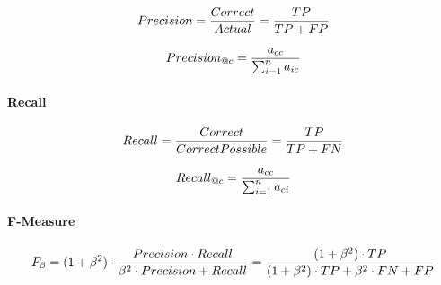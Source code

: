 \documentclass[10pt]{article}
\newif\ifen
\newif\ifde
\newcommand{\en}[1]{\ifen#1\fi}
\newcommand{\de}[1]{\ifde#1\fi}
\begin{document}
				\begin{equation}
					Precision = {{Correct} \over {Actual}} = {{TP} \over {TP + FP}}
				\end{equation}

				\de{Oder genauer für die Klasse c:}
				\en{Or more precisely for class c:}

				\begin{equation}
					Precision_{@c} = {{a_{cc}} \over {\sum_{i=1}^{n} a_{ic}}}
				\end{equation}

			\paragraph{Recall}
				\de{Recall\footnote{``Precision and recall'', Wikipedia contributors, February 7, 2020, \url{https://en.wikipedia.org/wiki/Precision_and_recall}} ist die Genauigkeit einer Klasse. Das bedeutet wie gut konnte die Klasse vorhergesehen werden:}
				\en{Recall\footnote{``Precision and recall'', Wikipedia contributors, February 7, 2020, \url{https://en.wikipedia.org/wiki/Precision_and_recall}} is the accuracy of a class. This means how well the class could be predicted:}

				\begin{equation}
					Recall = {{Correct} \over {CorrectPossible}} = {{TP} \over {TP + FN}}
				\end{equation}

				\de{Oder genauer für die Klasse c:}
				\en{Or more precisely for class c:}

				\begin{equation}
					Recall_{@c} = {{a_{cc}} \over {\sum_{i=1}^{n} a_{ci}}}
				\end{equation}

			\paragraph{F-Measure}
				\de{F-Measure\footnote{``F1 score'', Wikipedia contributors, February 7, 2020, \url{https://en.wikipedia.org/wiki/F1_score}} kombiniert Präzision und Rückruf, wobei der Parameter \(\beta\) die Gewichtung darstellt:}
				\en{F-Measure\footnote{``F1 score'', Wikipedia contributors, February 7, 2020, \url{https://en.wikipedia.org/wiki/F1_score}} combines precision and recall, with the parameter \(\beta\) representing the weighting:}
				\begin{equation}
					F_\beta =
					(1 + \beta^2) \cdot {{Precision\cdot Recall}\over{\beta^2 \cdot Precision + Recall}} = 
					{{(1 + \beta^2) \cdot TP}\over{(1 + \beta^2) \cdot TP + \beta^2 \cdot FN + FP}}
				\end{equation}
\end{document}
